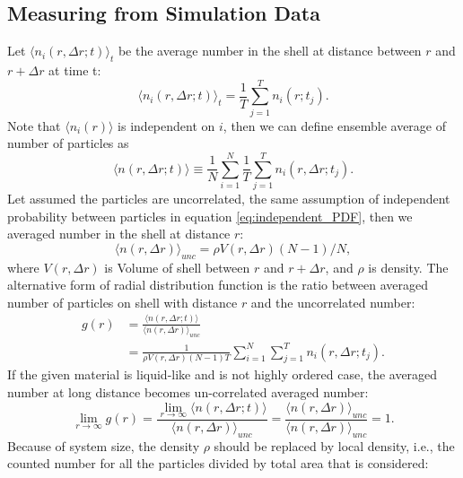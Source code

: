 \documentclass[10pt, a4paper]{report}
\begin{document}
\begin{appendices}
  \subsection{Measuring from Simulation Data}
  Let $\langle n_i(r, \Delta r; t)\rangle_t$ be the average number in the shell at distance between $r$ and $r+\Delta r$ at time t: 
  \begin{equation}
    \langle n_i(r, \Delta r; t)\rangle_t = \frac{1}{T}\sum_{j=1}^{T}n_{i}(r;t_j).
  \end{equation}
  Note that $\langle n_i(r)\rangle$ is independent on $i$, then we can define ensemble average of number of particles as
  \begin{equation}
    \langle n(r, \Delta r; t)\rangle \equiv \frac{1}{N}\sum_{i=1}^{N}\frac{1}{T}\sum_{j=1}^{T}n_{i}(r, \Delta r; t_j).
  \end{equation}
  Let assumed the particles are uncorrelated, the same assumption of independent probability between particles in equation \eqref{eq:independent_PDF}, then we averaged number in the shell at distance $r$:
  \begin{equation}
    \langle n(r, \Delta r)\rangle_{unc} = \rho V(r, \Delta r) (N-1)/N,
  \end{equation}
  where $V(r, \Delta r)$ is Volume of shell between $r$ and $r+\Delta r$, and $\rho$ is density.
  The alternative form of radial distribution function is the ratio between averaged number of particles on shell with distance $r$ and the uncorrelated number:
  \begin{align}
    g(r) &= \frac{\langle n(r, \Delta r; t)\rangle}{\langle n(r, \Delta r)\rangle_{unc}} \\
    &= \frac{1}{\rho V(r, \Delta r)(N-1)T}\sum_{i=1}^{N}\sum_{j=1}^{T}n_i(r, \Delta r; t_j).\label{eq:practical_RDF}
  \end{align}
  If the given material is liquid-like and is not highly ordered case, the averaged number at long distance becomes un-correlated averaged number:
  \begin{equation}
    \lim_{r\to\infty} g(r) = \frac{\lim_{r\to\infty}\langle n(r,\Delta r;t)\rangle}{\langle n(r,\Delta r)\rangle_{unc}} = \frac{\langle n(r,\Delta r)\rangle_{unc}}{\langle n(r,\Delta r)\rangle_{unc}} = 1.
  \end{equation}
  Because of system size, the density $\rho$ should be replaced by local density, i.e., the counted number for all the particles divided by total area that is considered:
  \begin{equation}

\end{equation}
\end{appendices}
\end{document}
